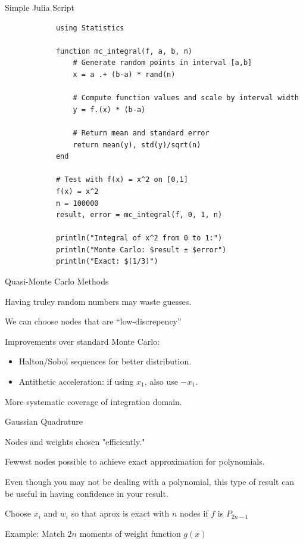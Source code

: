 \documentclass[notes,11pt, aspectratio=169]{beamer}
\newenvironment{wideitemize}{\itemize\addtolength{\itemsep}{10pt}}{\enditemize}
\begin{document}
\begin{frame}[fragile]{Simple Julia Script}
        \begin{lstlisting}
            using Statistics

            function mc_integral(f, a, b, n)
                # Generate random points in interval [a,b]
                x = a .+ (b-a) * rand(n)
                
                # Compute function values and scale by interval width
                y = f.(x) * (b-a)
                
                # Return mean and standard error
                return mean(y), std(y)/sqrt(n)
            end
            
            # Test with f(x) = x^2 on [0,1]
            f(x) = x^2
            n = 100000
            result, error = mc_integral(f, 0, 1, n)
            
            println("Integral of x^2 from 0 to 1:")
            println("Monte Carlo: $result ± $error")
            println("Exact: $(1/3)")
        \end{lstlisting}
\end{frame}


\begin{frame}{Quasi-Monte Carlo Methods}
\begin{wideitemize}
    \item Having truley random numbers may waste guesses. 
    \item We can choose nodes that are ``low-discrepency''
\item Improvements over standard Monte Carlo:
    \begin{itemize}
    \item Halton/Sobol sequences for better distribution.
    \item Antithetic acceleration: if using $x_1$, also use $-x_1$.
    \end{itemize}
\item More systematic coverage of integration domain.
\end{wideitemize}
\end{frame}

\begin{frame}{Gaussian Quadrature}
\begin{wideitemize}
\item Nodes and weights chosen "efficiently."
\item Fewwst nodes possible to achieve exact approximation for polynomials. 
\item Even though you may not be dealing with a polynomial, this type of result can be useful in having confidence in your result.
\item Choose $x_i$ and $w_i$ so that aprox is exact with $n$ nodes if $f$ is $P_{2n-1}$
\item Example: Match $2n$ moments of weight function $g(x)$
\end{wideitemize}
\end{frame}
\end{document}
